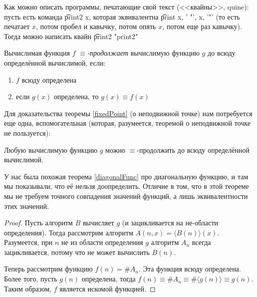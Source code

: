 \begin{Rem}
	Как можно описать программы, печатающие свой текст (<<квайны>>, quine): пусть есть команда \t{print2 x}, которая
	эквивалентна \t{print x, ' "', x, '"'} (то есть печатает $x$, потом пробел и кавычку, потом опять $x$, потом еще раз кавычку).
	Тогда можно написать квайн \t{print2 "print2"}
\end{Rem}

\begin{Def}
	Вычислимая функция $f$ \textit{$\equiv$-продолжает} вычислимую функцию $g$ до всюду определённой вычислимой, если:
	\begin{enumerate}
	\item $f$ всюду определена
	\item если $g(x)$ определена, то $g(x) \equiv f(x)$
	\end{enumerate}
\end{Def}


\label{fixedPointProof}
Для доказательства теоремы \ref{fixedPoint} (о неподвижной точке) нам потребуется еще одна, вспомогательная
(которая, разумеется, теоремой о неподвижной точке не пользуется):
\begin{theorem}\label{equivFuncExtend}
	Любую вычислимую функцию $g$ можно $\equiv$-продолжить до всюду определённой вычислимой.
\end{theorem}
\begin{Rem}
	У нас была похожая теорема \ref{diagonalFunc} про диагональную функцию, и там мы показывали, что её нельзя доопределить.
	Отличие в том, что в этой теореме мы не требуем точного совпадения значений функций, а лишь эквивалентности этих значений.
\end{Rem}
\begin{proof}
	Пусть алгоритм $B$ вычисляет $g$ (и зацикливается на не-области определения).
	Тогда рассмотрим алгоритм $A(n, x)=\langle B(n) \rangle(x)$.
	Разумеется, при $n$ не из области определения $g$ алгоритм $A_n$ всегда зацикливается, потому что не может вычислить $B(n)$.

	Теперь рассмотрим функцию $f(n) = \# A_n$.
	Эта функция всюду определена.
	Более того, пусть $g(n)$ определена, тогда $f(n) \equiv \# A_n \equiv \# \langle g(n) \rangle \equiv g(n)$.
	Таким образом, $f$ является искомой функцией.
\end{proof}

